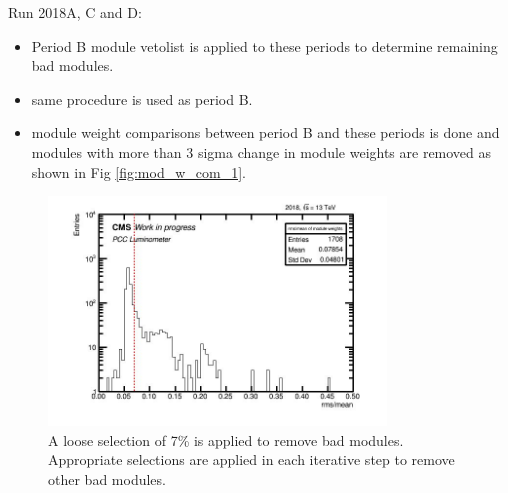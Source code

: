Run 2018A, C and D:                                                                      
\begin{itemize}  

\item Period B module vetolist is applied to these periods to determine remaining bad modules.

\item same procedure is used as period B. 

\item module weight comparisons between period B and these periods is done and modules with more than 3 sigma change in module weights are removed as shown in %
  Fig \ref{fig:mod_w_com_1}.                                                                              
\end{itemize}



\begin{figure}[!htp]
\centering
\includegraphics[width=0.8\textwidth]{ashish_thesis/cut_selection_1.png}
\caption[First Iteration For Outlier Module Removal]{%
   A loose selection of 7\% is applied to remove bad modules. Appropriate selections are applied in each iterative step to remove other bad modules.
}
\label{fig:outliermodules}
\end{figure}


